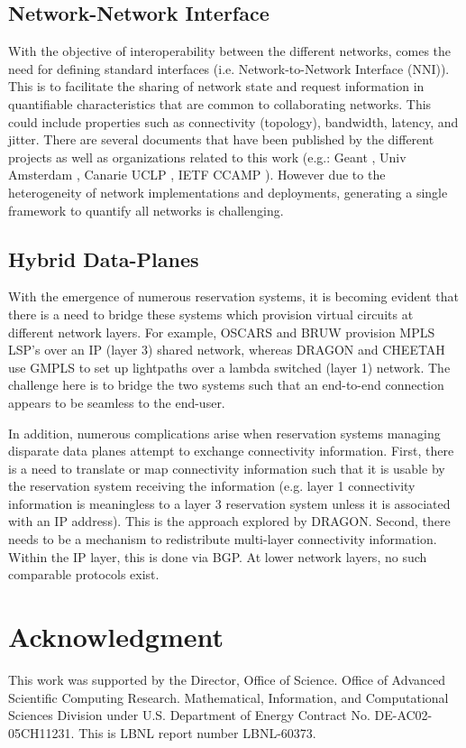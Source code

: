 \documentclass[conference]{IEEEtran}
\begin{document}
\subsection{Network-Network Interface}
With the objective of interoperability between the different networks,
comes the need for defining standard interfaces (i.e. Network-to-Network
Interface (NNI)).  This is to facilitate the sharing of network state and
request information in quantifiable characteristics that are common to
collaborating networks.  This could include properties such as connectivity
(topology), bandwidth, latency, and jitter.  There are several documents
that have been published by the different projects as well as organizations
related to this work (e.g.: Geant \cite{GEANT},  Univ Amsterdam \cite{ndl}, 
Canarie UCLP \cite{canarie-interop}, IETF CCAMP \cite{ietf-ccamp}). However 
due to the
heterogeneity of network implementations and deployments, generating a single
framework to quantify all networks is challenging.

\subsection{Hybrid Data-Planes}
With the emergence of numerous reservation systems, it is becoming evident 
that there is a need to bridge these systems which provision virtual circuits 
at different network layers.
For example, OSCARS and BRUW provision MPLS LSP's over an IP (layer 3) shared 
network, whereas DRAGON and CHEETAH use
GMPLS to set up lightpaths over a lambda switched (layer 1) network.
The challenge here is to bridge the two systems such
that an end-to-end connection appears to be seamless to the end-user.

In addition, numerous complications arise when reservation systems managing 
disparate data planes attempt to exchange connectivity information.  First, 
there is a need to translate or map connectivity information such that it is 
usable by the reservation system receiving the information (e.g. layer 1 
connectivity information is meaningless to a layer 3 reservation system unless 
it is associated with an IP address).  This is the approach explored by DRAGON.
Second, there needs to be a mechanism to redistribute multi-layer connectivity 
information. Within the IP layer, this is done via BGP.  At lower network 
layers, no such comparable protocols exist.

\section*{Acknowledgment}
This work was supported by the Director, Office of Science. Office of
Advanced Scientific Computing Research. Mathematical, Information, and
Computational Sciences Division under U.S. Department of
Energy Contract No. DE-AC02-05CH11231. This is LBNL report number LBNL-60373.
\end{document}
